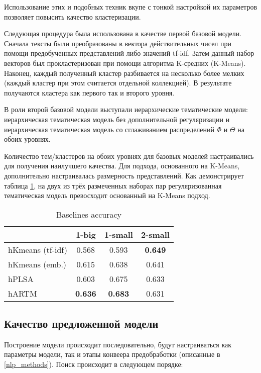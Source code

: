 Использование этих и подобных техник вкупе с тонкой настройкой их параметров позволяет повысить качество кластеризации.

Следующая процедура была использована в качестве первой базовой модели. Сначала тексты были преобразованы в вектора действительных чисел при помощи предобученных представлений либо значений tf-idf. Затем данный набор векторов был прокластеризован при помощи алгоритма K-средних (K-Means). Наконец, каждый полученный кластер разбивается на несколько более мелких (каждый кластер при этом считается отдельной коллекцией). В результате получаются кластера как первого так и второго уровня.

В роли второй базовой модели выступали иерархические тематические модели: иерархическая тематическая модель без дополнительной регуляризации и иерархическая тематическая модель со сглаживанием распределений  $\Phi$ и $\Theta$ на обоих уровнях.

Количество тем/кластеров на обоих уровнях для базовых моделей настраивались для получения наилучшего качества. Для подхода, основанного на K-Means, дополнительно настраивалась размерность представлений. Как демонстрирует таблица  \ref{baselines}, на двух из трёх размеченных наборах пар регуляризованная тематическая модель превосходит основанный на K-Means подход.

\begin{table}[!h]
    \centering
\begin{tabular}{p{2.7cm}|c|c|c}
    \hline
    & 1-big           & 1-small            & 2-small            \\ \hline
    hKmeans (tf-idf)      & 0.568          & 0.593          & \textbf{0.649} \\
    hKmeans (emb.) & 0.615          & 0.638          & 0.641          \\
    hPLSA         & 0.603          & 0.675          & 0.633          \\
    hARTM         & \textbf{0.636} & \textbf{0.683} & 0.631          \\  \hline 
\end{tabular}
    \caption{Baselines accuracy}
    \label{baselines}
\end{table}

\subsection{Качество предложенной модели}

Построение модели происходит последовательно, будут настраиваться как параметры модели, так и этапы конвеера предобработки (описанные в \ref{nlp_methods}). Поиск происходит в следующем порядке:

